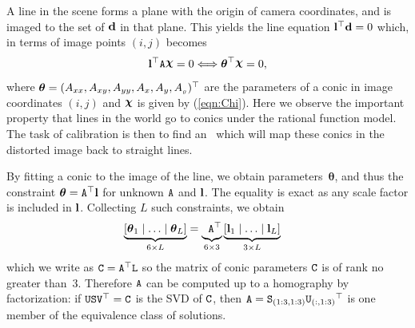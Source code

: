 \documentclass[extendedabs]{bmvc2k}
\begin{document}
\def\conic{{\boldsymbol\theta}}
A line in the scene forms a plane with the origin of camera
coordinates, and is imaged to the set of ${\bf d}$ in that plane.
This yields the line equation ${\bf l}^{\top} {\bf d} = 0$ which, in
terms of image points $(i,j)$ becomes
\begin{equation}
\vect l\tr \A \Chi = 0 \Longleftrightarrow \conic^{\top} \Chi = 0,
\end{equation}
where $\conic = (A_{xx}, A_{xy}, A_{yy}, A_x, A_y,
A_{_\mathit{0}})\tr$ are the parameters of a conic in image coordinates $(i,j)$
and $\Chi$ is given by (\ref{eqn:Chi}).  Here we observe the
important property that lines in the world go to conics under the
rational function model.  The task of calibration is then to find an
\A\ which will map these conics in the distorted image back to
straight lines.

By fitting a conic to the image of the line, we obtain
parameters~$\conic$, and thus the constraint
$\conic = \A\tr \vect l$
for unknown $\mbox{${\tt A}$}$ and ${\bf l}$.  The equality is exact as any scale
factor is included in ${\bf l}$. Collecting $L$ such constraints, we
obtain
\begin{align}
\underbrace{\left[ \conic_1 \mid \ldots \mid \conic_L
\right]}_{6\times L} & =
\underbrace{\phantom{\left[\right]}\A\tr}_{6\times 3}
\underbrace{\left[ \vect l_1 \mid \ldots \mid \vect l_L \right]}_{3\times L}
\nonumber
\end{align}
which we write as
$\mbox{\tt C} = \mbox{${\tt A}$}^{\top} \mbox{\tt L}\label{eqn:proj_line}$
so the matrix of conic parameters $\mbox{\tt C}$ is of rank no greater
than~$3$.  Therefore $\mbox{${\tt A}$}$ can be computed up to a homography by
factorization: if $\mbox{\tt U} \mbox{\tt S} \mbox{\tt V}^{\top} = \mbox{\tt C}$ is the SVD
of $\mbox{\tt C}$, then $\mbox{${\tt A}$} = \mbox{\tt S}_{(1:3,1:3)} {\mbox{\tt U}_{(:,1:3)}}^{\top}$
is one member of the equivalence class of solutions.
\end{document}
